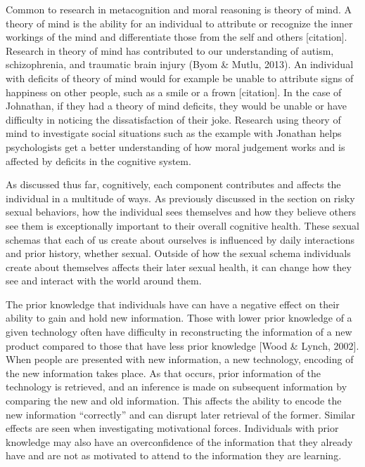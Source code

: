 \documentclass[
  english,
  donotrepeattitle,doc, 12pt, a4paper,floatsintext]{apa7}
\begin{document}
Common to research in metacognition and moral reasoning is theory of mind. A theory of mind is the ability for an individual to attribute or recognize the inner workings of the mind and differentiate those from the self and others {[}citation{]}. Research in theory of mind has contributed to our understanding of autism, schizophrenia, and traumatic brain injury (Byom \& Mutlu, 2013). An individual with deficits of theory of mind would for example be unable to attribute signs of happiness on other people, such as a smile or a frown {[}citation{]}. In the case of Johnathan, if they had a theory of mind deficits, they would be unable or have difficulty in noticing the dissatisfaction of their joke. Research using theory of mind to investigate social situations such as the example with Jonathan helps psychologists get a better understanding of how moral judgement works and is affected by deficits in the cognitive system.

As discussed thus far, cognitively, each component contributes and affects the individual in a multitude of ways. As previously discussed in the section on risky sexual behaviors, how the individual sees themselves and how they believe others see them is exceptionally important to their overall cognitive health. These sexual schemas that each of us create about ourselves is influenced by daily interactions and prior history, whether sexual. Outside of how the sexual schema individuals create about themselves affects their later sexual health, it can change how they see and interact with the world around them.

The prior knowledge that individuals have can have a negative effect on their ability to gain and hold new information. Those with lower prior knowledge of a given technology often have difficulty in reconstructing the information of a new product compared to those that have less prior knowledge {[}Wood \& Lynch, 2002{]}. When people are presented with new information, a new technology, encoding of the new information takes place. As that occurs, prior information of the technology is retrieved, and an inference is made on subsequent information by comparing the new and old information. This affects the ability to encode the new information ``correctly'' and can disrupt later retrieval of the former. Similar effects are seen when investigating motivational forces. Individuals with prior knowledge may also have an overconfidence of the information that they already have and are not as motivated to attend to the information they are learning.
\end{document}
